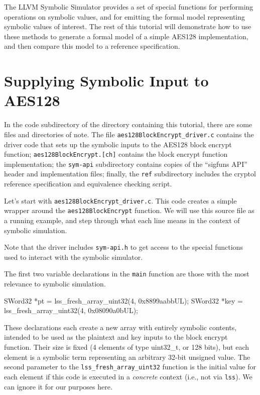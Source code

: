 \documentclass[11pt]{article}
\begin{document}
The LLVM Symbolic Simulator provides a set of special functions for
performing operations on symbolic values, and for emitting the formal
model representing symbolic values of interest. The rest of this
tutorial will demonstrate how to use these methods to generate a formal
model of a simple AES128 implementation, and then compare this model to
a reference specification.

\section{Supplying Symbolic Input to AES128}

In the code subdirectory of the directory containing this tutorial,
there are some files and directories of note.  The file
\texttt{aes128BlockEncrypt\_driver.c} contains the driver code that sets
up the symbolic inputs to the AES128 block encrypt function;
\texttt{aes128BlockEncrypt.[ch]} contains the block encrypt function
implementation; the \texttt{sym-api} subdirectory contains copies of the
``sigfuns API'' header and implementation files; finally, the
\texttt{ref} subdirectory includes the cryptol reference specification
and equivalence checking script.

Let's start with \texttt{aes128BlockEncrypt\_driver.c}.  This code
creates a simple wrapper around the \texttt{aes128BlockEncrypt}
function.  We will use this source file as a running example, and step
through what each line means in the context of symbolic simulation.

Note that the driver includes \texttt{sym-api.h} to get access to the
special functions used to interact with the symbolic simulator.

The first two variable declarations in the \texttt{main} function are
those with the most relevance to symbolic simulation.

\begin{code}
SWord32 *pt  = lss_fresh_array_uint32(4, 0x8899aabbUL);
SWord32 *key = lss_fresh_array_uint32(4, 0x08090a0bUL);
\end{code}

These declarations each create a new array with entirely symbolic
contents, intended to be used as the plaintext and key inputs to the
block encrypt function.  Their size is fixed (4 elements of type
uint32\_t, or 128 bits), but each element is a symbolic term
representing an arbitrary 32-bit unsigned value.  The second parameter
to the \texttt{lss\_fresh\_array\_uint32} function is the initial value
for each element if this code is executed in a \emph{concrete} context
(i.e., not via \texttt{lss}).  We can ignore it for our purposes here.
\end{document}
